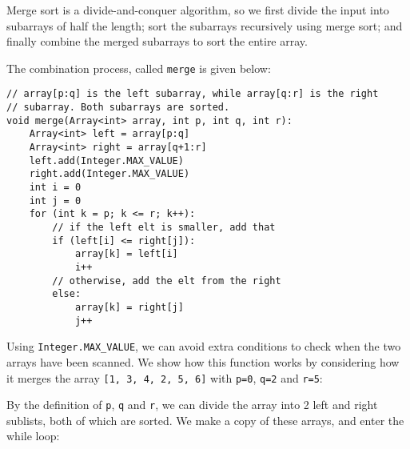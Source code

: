 \documentclass[a4paper, openany]{memoir}
\begin{document}
\noindent Merge sort is a divide-and-conquer algorithm, so we first divide the input into subarrays of half the length; sort the subarrays recursively using merge sort; and finally combine the merged subarrays to sort the entire array. 

\noindent The combination process, called \texttt{merge} is given below:
\begin{lstlisting}[language=pseudocode]
// array[p:q] is the left subarray, while array[q:r] is the right
// subarray. Both subarrays are sorted.
void merge(Array<int> array, int p, int q, int r):
    Array<int> left = array[p:q]
    Array<int> right = array[q+1:r]
    left.add(Integer.MAX_VALUE)
    right.add(Integer.MAX_VALUE)
    int i = 0
    int j = 0
    for (int k = p; k <= r; k++):
        // if the left elt is smaller, add that
        if (left[i] <= right[j]):
            array[k] = left[i]
            i++
        // otherwise, add the elt from the right
        else:
            array[k] = right[j]
            j++
\end{lstlisting}
Using \texttt{Integer.MAX\_VALUE}, we can avoid extra conditions to check when the two arrays have been scanned. We show how this function works by considering how it merges the array \texttt{[1, 3, 4, 2, 5, 6]} with \texttt{p=0}, \texttt{q=2} and \texttt{r=5}:
\begin{center}
\end{center}
By the definition of \texttt{p}, \texttt{q} and \texttt{r}, we can divide the array into 2 left and right sublists, both of which are sorted. We make a copy of these arrays, and enter the while loop:
\begin{center}
\end{center}
\end{document}
